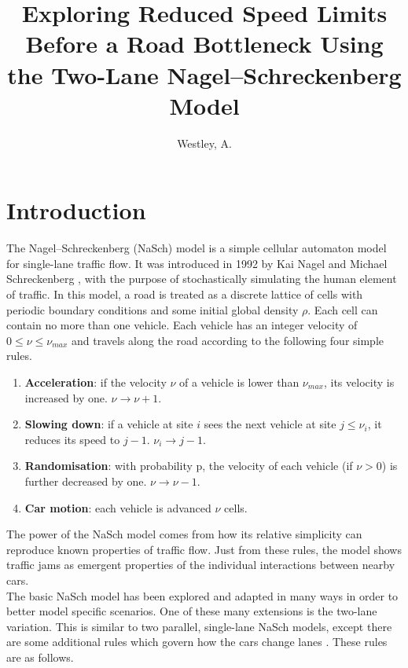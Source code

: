 \documentclass[11pt]{article}
\title{Exploring Reduced Speed Limits Before a Road Bottleneck Using the Two-Lane Nagel--Schreckenberg Model}
\author{Westley, A.}
\begin{document}
	
	\maketitle
	
	\hfill \break
	
	\section{Introduction} \label{sec:intro}
	
	The Nagel--Schreckenberg (NaSch) model is a simple cellular automaton model for single-lane traffic flow. It was introduced in 1992 by Kai Nagel and Michael Schreckenberg \cite{nagel1992cellular}, with the purpose of stochastically simulating the human element of traffic. In this model, a road is treated as a discrete lattice of cells with periodic boundary conditions and some initial global density $\rho$. Each cell can contain no more than one vehicle. Each vehicle has an integer velocity of $0 \leq \nu \leq \nu_{max}$ and travels along the road according to the following four simple rules.
	
	\begin{enumerate}
		\item \textbf{Acceleration}: if the velocity $\nu$ of a vehicle is lower than $\nu_{max}$, its velocity is increased by one. $\nu \rightarrow \nu + 1$.
		\item \textbf{Slowing down}: if a vehicle at site $i$ sees the next vehicle at site $j \leq \nu_i$, it reduces its speed to $j-1$. $\nu_i \rightarrow j-1$.
		\item \textbf{Randomisation}: with probability p, the velocity of each vehicle (if $\nu > 0$) is further decreased by one. $\nu \rightarrow \nu - 1$.
		\item \textbf{Car motion}: each vehicle is advanced $\nu$ cells.
	\end{enumerate}
	
	The power of the NaSch model comes from how its relative simplicity can reproduce known properties of traffic flow. Just from these rules, the model shows traffic jams as emergent properties of the individual interactions between nearby cars. \\
	
	The basic NaSch model has been explored and adapted in many ways in order to better model specific scenarios. One of these many extensions is the two-lane variation. This is similar to two parallel, single-lane NaSch models, except there are some additional rules which govern how the cars change lanes \cite{wright2013flow}. These rules are as follows.
	
\end{document}
